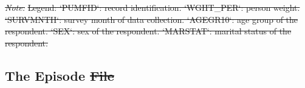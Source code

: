 \documentclass[Royal,times,sageh]{sagej}
\providecommand{\DIFaddtex}[1]{{\protect\color{blue}\uwave{#1}}} %
\providecommand{\DIFdeltex}[1]{{\protect\color{red}\sout{#1}}} %
\providecommand{\DIFaddbegin}{} %
\providecommand{\DIFaddend}{} %
\providecommand{\DIFdelbegin}{} %
\providecommand{\DIFdelend}{} %
\providecommand{\DIFadd}[1]{\texorpdfstring{\DIFaddtex{#1}}{#1}} %
\providecommand{\DIFdel}[1]{\texorpdfstring{\DIFdeltex{#1}}{}} %
\begin{document}
\DIFdelbegin %
\textit{\DIFdel{Note: }} 
\DIFdel{Legend: `PUMFID`: record identification. `WGHT\_PER`:  person weight. `SURVMNTH`: survey month of data collection. `AGEGR10`: age group of the respondent. `SEX`: sex of the respondent. `MARSTAT`: marital status of the respondent.
}%

\DIFdelend \subsection{The Episode \DIFdelbegin \DIFdel{File}\DIFdelend \DIFaddbegin \DIFadd{file}\DIFaddend }\label{the-episode-file}
\end{document}

